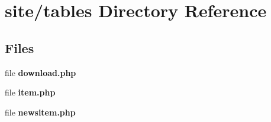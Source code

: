 \section{site/tables Directory Reference}
\label{dir_5a5673c74823ead7914304d6bd048c4f}
\subsection*{Files}
\begin{DoxyCompactItemize}
\item 
file \textbf{ download.\+php}
\item 
file \textbf{ item.\+php}
\item 
file \textbf{ newsitem.\+php}
\end{DoxyCompactItemize}
